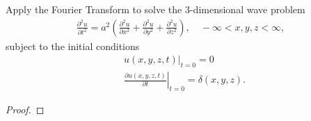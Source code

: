 \begin{problem}{8}
  Apply the Fourier Transform to solve the 3-dimensional wave problem
  \begin{align*}
    \frac{\partial^2 u}{\partial t^2} = a^2\left(\frac{\partial^2 u}{\partial x^2} + \frac{\partial^2 u}{\partial y^2} + \frac{\partial^2 u}{\partial z^2}\right), \quad -\infty < x, y, z < \infty,
  \end{align*}
  subject to the initial conditions
  \begin{align*}
    &u(x, y, z, t)\rvert_{t=0} = 0 \\
    &\left.\frac{\partial u(x, y, z, t)}{\partial t}\right\rvert_{t=0} = \delta(x, y, z).
  \end{align*}
\end{problem}

\begin{proof}
\end{proof}
\newpage
